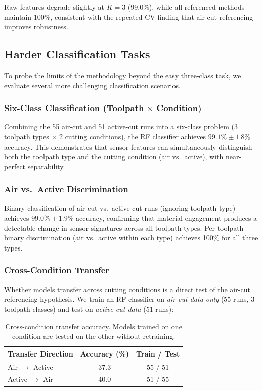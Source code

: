 Raw features degrade slightly at $K = 3$ (99.0\%), while all referenced methods maintain 100\%, consistent with the repeated CV finding that air-cut referencing improves robustness.

\subsection{Harder Classification Tasks}

To probe the limits of the methodology beyond the easy three-class task, we evaluate several more challenging classification scenarios.

\subsubsection{Six-Class Classification (Toolpath $\times$ Condition)}

Combining the 55 air-cut and 51 active-cut runs into a six-class problem (3 toolpath types $\times$ 2 cutting conditions), the RF classifier achieves $99.1\% \pm 1.8\%$ accuracy. This demonstrates that sensor features can simultaneously distinguish both the toolpath type and the cutting condition (air vs.\ active), with near-perfect separability.

\subsubsection{Air vs.\ Active Discrimination}

Binary classification of air-cut vs.\ active-cut runs (ignoring toolpath type) achieves $99.0\% \pm 1.9\%$ accuracy, confirming that material engagement produces a detectable change in sensor signatures across all toolpath types. Per-toolpath binary discrimination (air vs.\ active within each type) achieves 100\% for all three types.

\subsubsection{Cross-Condition Transfer}

Whether models transfer across cutting conditions is a direct test of the air-cut referencing hypothesis. We train an RF classifier on \textit{air-cut data only} (55 runs, 3 toolpath classes) and test on \textit{active-cut data} (51 runs):

\begin{table}[H]
\caption{Cross-condition transfer accuracy. Models trained on one condition are tested on the other without retraining.}\label{tab:cross_condition}
\centering
\begin{tabular}{lcc}
\toprule
\textbf{Transfer Direction} & \textbf{Accuracy (\%)} & \textbf{Train / Test} \\
\midrule
Air $\rightarrow$ Active   & 37.3 & 55 / 51 \\
Active $\rightarrow$ Air   & 40.0 & 51 / 55 \\
\bottomrule
\end{tabular}
\end{table}

